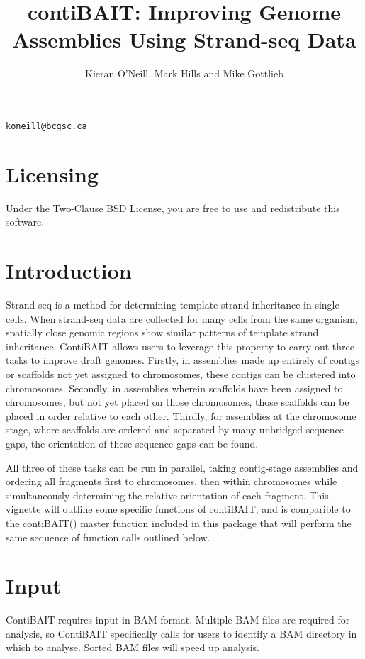 \documentclass{article}
\title{contiBAIT: Improving Genome Assemblies Using Strand-seq Data}
\author{Kieran O'Neill, Mark Hills and Mike Gottlieb}
\begin{document}


\maketitle
\begin{center}
{\tt koneill@bcgsc.ca}
\end{center}

\textnormal{\normalfont}

\tableofcontents
\newpage



\section{Licensing}
Under the Two-Clause BSD License, you are free to use and redistribute this software.

\section{Introduction}
Strand-seq is a method for determining template strand inheritance in single cells.
When strand-seq data are collected for many cells from the same organism, spatially close genomic regions show similar patterns of template strand inheritance.
ContiBAIT allows users to leverage this property to carry out three tasks to improve draft genomes. Firstly, in assemblies made up entirely of contigs or scaffolds not yet assigned to chromosomes, these contigs can be clustered into chromosomes. Secondly, in assemblies wherein scaffolds have been assigned to chromosomes, but not yet placed on those chromosomes, those scaffolds can be placed in order relative to each other. Thirdly, for assemblies at the chromosome stage, where scaffolds are ordered and separated by many unbridged sequence gaps, the orientation of these sequence gaps can be found.  

All three of these tasks can be run in parallel, taking contig-stage assemblies and ordering all fragments first to chromosomes, then within chromosomes while simultaneously determining the relative orientation of each fragment. This vignette will outline some specific functions of contiBAIT, and is comparible to the contiBAIT() master function included in this package that will perform the same sequence of function calls outlined below.

\section{Input}
ContiBAIT requires input in BAM format. Multiple BAM files are required for analysis, so ContiBAIT specifically calls for users to identify a BAM directory in which to analyse. Sorted BAM files will speed up analysis. 
 
\end{document}
